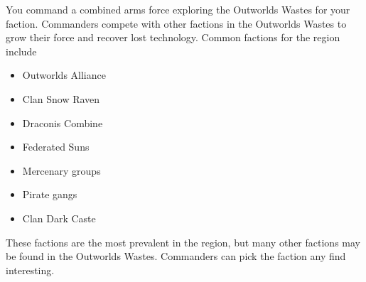 You command a combined arms force exploring the Outworlds Wastes for your faction.
Commanders compete with other factions in the Outworlds Wastes to grow their force and recover lost technology.
Common factions for the region include


\begin{itemize}

\item Outworlds Alliance

\item Clan Snow Raven

\item Draconis Combine

\item Federated Suns

\item Mercenary groups

\item Pirate gangs

\item Clan Dark Caste


\end{itemize}


These factions are the most prevalent in the region, but many other factions may be found in the Outworlds Wastes.
Commanders can pick the faction any find interesting.
